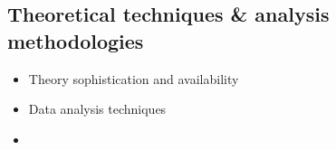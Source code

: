\subsection{Theoretical techniques \& analysis methodologies}

\begin{itemize}
\item Theory sophistication and availability
\item Data analysis techniques
\item 
\end{itemize}
